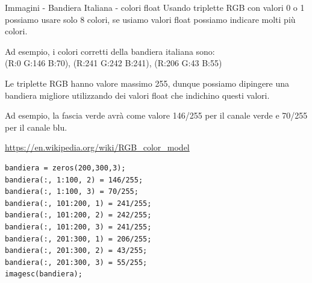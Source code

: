 \documentclass[aspectratio=169]{beamer}
\begin{document}
\begin{frame}{Immagini - Bandiera Italiana - colori float}
Usando triplette RGB con valori 0 o 1 possiamo usare solo 8 colori, se usiamo valori float possiamo indicare molti più colori.

Ad esempio, i colori corretti della bandiera italiana sono:\\
(R:0 G:146 B:70), (R:241 G:242 B:241), (R:206 G:43 B:55)

Le triplette RGB hanno valore massimo 255, dunque possiamo dipingere una bandiera migliore utilizzando dei valori float che indichino questi valori.

Ad esempio, la fascia verde avrà come valore 146/255 per il canale verde e 70/255 per il canale blu.

\url{https://en.wikipedia.org/wiki/RGB_color_model}

\pause

\begin{lstlisting}[style=matlab]
bandiera = zeros(200,300,3);
bandiera(:, 1:100, 2) = 146/255;
bandiera(:, 1:100, 3) = 70/255;
bandiera(:, 101:200, 1) = 241/255;
bandiera(:, 101:200, 2) = 242/255;
bandiera(:, 101:200, 3) = 241/255;
bandiera(:, 201:300, 1) = 206/255;
bandiera(:, 201:300, 2) = 43/255;
bandiera(:, 201:300, 3) = 55/255;
imagesc(bandiera);
\end{lstlisting}
\end{frame}
\end{document}

